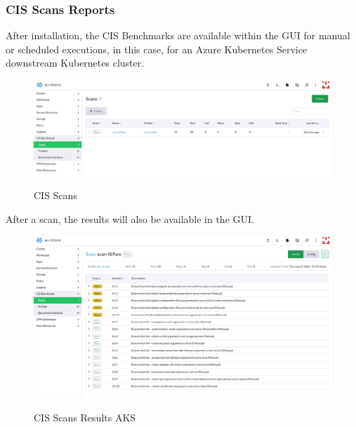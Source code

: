 \subsubsection{CIS Scans Reports}

After installation, the CIS Benchmarks are available within the GUI for manual or scheduled executions, in this case, for an Azure Kubernetes Service downstream Kubernetes cluster.

\begin{figure}[H]
\centering
\caption {CIS Scans}
\includegraphics[width=\linewidth]{images/cis-scans-1.png}
\label{fig:cisScans}
\end{figure}

\pagebreak
After a scan, the results will also be available in the GUI.

\begin{figure}[H]
\centering
\caption {CIS Scans Results AKS}
\includegraphics[width=\linewidth]{images/cis-scans-2.png}
\label{fig:cisAKS}
\end{figure}

